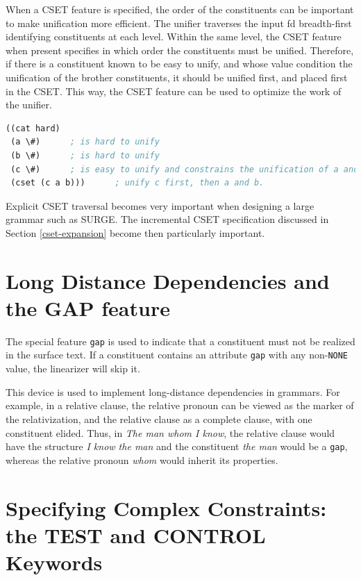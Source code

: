 \documentclass[10pt,a4paper]{report}
\begin{document}
\begin{appendices}
When a CSET feature is specified, the order of the constituents can be
important to make unification more efficient.  The unifier traverses the
input fd breadth-first identifying constituents at each level.  Within the
same level, the CSET feature when present specifies in which order the
constituents must be unified.  Therefore, if there is a constituent known
to be easy to unify, and whose value condition the unification of the
brother constituents, it should be unified first, and placed first in the
CSET.  This way, the CSET feature can be used to optimize the work of the
unifier.  

\begin{lstlisting}[language=Lisp]
((cat hard)
 (a \#)      ; is hard to unify
 (b \#)      ; is hard to unify
 (c \#)      ; is easy to unify and constrains the unification of a and b
 (cset (c a b)))      ; unify c first, then a and b.
\end{lstlisting}

Explicit CSET traversal becomes very important when designing a large
grammar such as SURGE.  The incremental CSET specification discussed in
Section \ref{cset-expansion} become then particularly important.


\section{Long Distance Dependencies and the GAP feature}

The special feature {\tt gap} is used to indicate that a
constituent must not be realized in the surface text. If a
constituent contains an attribute {\tt gap} with any non-{\tt NONE}
value, the linearizer will skip it.

This device is used to implement long-distance dependencies in
grammars. For example, in a relative clause, the relative pronoun
can be viewed as the marker of the relativization, and the
relative clause as a complete clause, with one constituent
elided. Thus, in {\em The man whom I know}, the relative clause
would have the structure {\em I know the man} and the constituent
{\em the man} would be a {\tt gap}, whereas the relative pronoun
{\em whom} would inherit its properties.


\section{Specifying Complex Constraints: the TEST and CONTROL Keywords}



\end{appendices}
\end{document}
